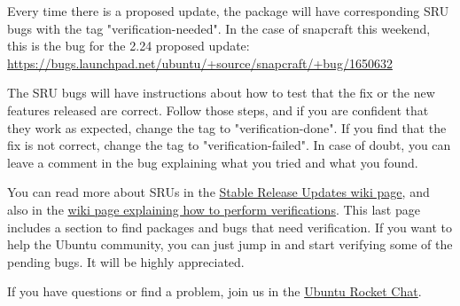 \documentclass[12pt]{article}
\begin{document}
Every time there is a proposed update, the package will have corresponding SRU
bugs with the tag "verification-needed". In the case of snapcraft this weekend,
this is the bug for the 2.24 proposed update:
\href{https://bugs.launchpad.net/ubuntu/+source/snapcraft/+bug/1650632}
     {https://bugs.launchpad.net/ubuntu/+source/snapcraft/+bug/1650632}

The SRU bugs will have instructions about how to test that the fix or the new
features released are correct. Follow those steps, and if you are confident
that they work as expected, change the tag to "verification-done". If you find
that the fix is not correct, change the tag to "verification-failed". In case
of doubt, you can leave a comment in the bug explaining what you tried and what
you found.

You can read more about SRUs in the
\href{https://wiki.ubuntu.com/StableReleaseUpdates}
     {Stable Release Updates wiki page},
and also in the
\href{https://wiki.ubuntu.com/QATeam/PerformingSRUVerification}
     {wiki page explaining how to perform verifications}.
This last page includes a section to find packages and bugs that need
verification. If you want to help the Ubuntu community, you can just jump in
and start verifying some of the pending bugs. It will be highly appreciated.

If you have questions or find a problem, join us in the
\href{https://rocket.ubuntu.com/channel/community}{Ubuntu Rocket Chat}.
\end{document}
